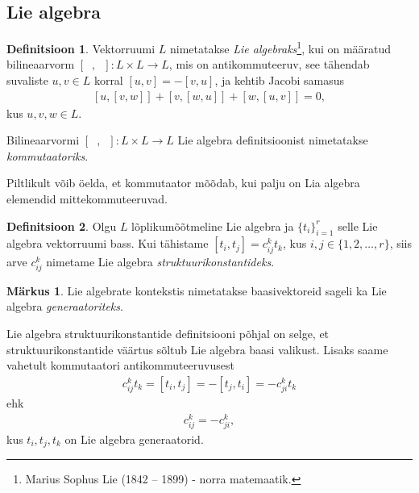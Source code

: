 \documentclass[12pt]{article}
\theoremstyle{plain}
\theoremstyle{definition}
\newtheorem{definitsioon}{Definitsioon}[section]
\newtheorem{markus}{Märkus}[section]
\numberwithin{equation}{section}
\begin{document}
\subsection{Lie algebra}

\begin{definitsioon} \label{def:lie-algebra}
Vektorruumi $L$ nimetatakse \emph{Lie algebraks}\footnote{
Marius Sophus Lie (1842 – 1899) - norra matemaatik.}, kui on 
määratud bilineaarvorm $\left[\phantom{u},\phantom{u}\right] : 
L \times L \rightarrow L$, mis on antikommuteeruv, see tähendab 
suvaliste $u, v \in L$ korral 
$\left[u, v\right] = - \left[v, u\right]$,
ja kehtib Jacobi samasus 
\begin{align*}
\left[u, \left[v, w\right]\right] + 
\left[v, \left[w, u\right]\right] + 
\left[w, \left[u, v\right]\right] = 0,
\end{align*}
kus $u, v, w \in L$.
\end{definitsioon}

Bilineaarvormi $\left[\phantom{u}, \phantom{u}\right] : 
L \times L \rightarrow L$ Lie algebra definitsioonist nimetatakse 
\emph{kommutaatoriks}.

Piltlikult võib öelda, et kommutaator mõõdab, kui palju on Lia 
algebra elemendid mittekommuteeruvad.

\begin{definitsioon}
Olgu $L$ lõplikumõõtmeline Lie algebra ja $\{t_i\}_{i = 1}^{r}$ 
selle Lie algebra vektorruumi bass. Kui tähistame 
$\left[t_i, t_j\right] = c_{ij}^{k} t_{k}$, kus 
$i,j \in \{1, 2, \ldots, r\}$, siis arve $c_{ij}^{k}$ nimetame Lie 
algebra \emph{struktuurikonstantideks}.
\end{definitsioon}

\begin{markus}
Lie algebrate kontekstis nimetatakse baasivektoreid sageli ka 
Lie algebra \emph{generaatoriteks}.
\end{markus}

Lie algebra struktuurikonstantide definitsiooni põhjal on selge, et 
struktuurikonstantide väärtus sõltub Lie algebra baasi valikust. 
Lisaks saame vahetult kommutaatori antikommuteeruvusest
\begin{align*}
c_{ij}^{k} t_k = \left[t_i, t_j\right] = - \left[t_j, t_i\right] = 
-c_{ji}^{k} t_k
\end{align*}
ehk
\begin{align} \label{eq:struktuurikonst-antikomm}
c_{ij}^{k} = -c_{ji}^{k},
\end{align}
kus $t_i, t_j, t_k$ on Lie algebra generaatorid.
\end{document}
